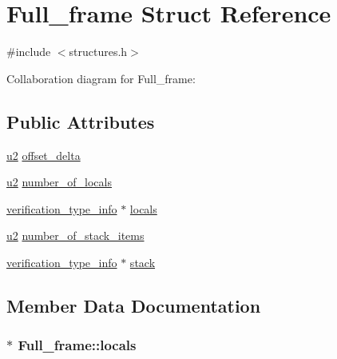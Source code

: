 \hypertarget{structFull__frame}{}\section{Full\+\_\+frame Struct Reference}
\label{structFull__frame}


{\ttfamily \#include $<$structures.\+h$>$}



Collaboration diagram for Full\+\_\+frame\+:
\subsection*{Public Attributes}
\begin{DoxyCompactItemize}
\item 
\hyperlink{structures_8h_a55ef8d87fd202b8417704c089899c5b9}{u2} \hyperlink{structFull__frame_a2f561b5115209c671be0395a95a53dd5}{offset\+\_\+delta}
\item 
\hyperlink{structures_8h_a55ef8d87fd202b8417704c089899c5b9}{u2} \hyperlink{structFull__frame_a71a6efd7eaea7f6eb0ad1de7c70b4245}{number\+\_\+of\+\_\+locals}
\item 
\hyperlink{structverification__type__info}{verification\+\_\+type\+\_\+info} $\ast$ \hyperlink{structFull__frame_a12b01bc78373d145cbae4553a7c9b6a5}{locals}
\item 
\hyperlink{structures_8h_a55ef8d87fd202b8417704c089899c5b9}{u2} \hyperlink{structFull__frame_a11b6e1548b1ca3c416abc3fa6c3d3935}{number\+\_\+of\+\_\+stack\+\_\+items}
\item 
\hyperlink{structverification__type__info}{verification\+\_\+type\+\_\+info} $\ast$ \hyperlink{structFull__frame_a40ff4ea967461300e1ce8dbb51e28fa0}{stack}
\end{DoxyCompactItemize}


\subsection{Member Data Documentation}
\subsubsection[{\texorpdfstring{locals}{locals}}]{$\ast$ Full\+\_\+frame\+::locals}\hypertarget{structFull__frame_a12b01bc78373d145cbae4553a7c9b6a5}{}\label{structFull__frame_a12b01bc78373d145cbae4553a7c9b6a5}
